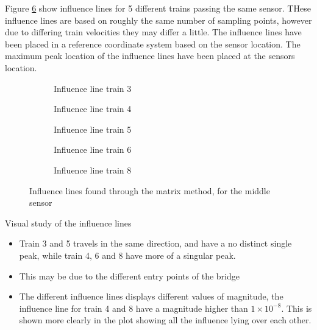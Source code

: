 Figure \ref{fig:Influence_lines} show influence lines for 5 different trains passing the same sensor. THese influence lines are based on roughly the same number of sampling points, however due to differing train velocities they may differ a little. The influence lines have been placed in a reference coordinate system based on the sensor location. The maximum peak location of the influence lines have been placed at the sensors location.
	\begin{figure}[H]
		\begin{subfigure}[t]{0.4\textwidth}
			
			\caption{Influence line train 3}
			\label{fig:train3}
		\end{subfigure}
		\qquad
		\begin{subfigure}[t]{0.4\textwidth}
			
			\caption{Influence line train 4}
			\label{fig:train4}
		\end{subfigure}
		\begin{subfigure}[t]{0.4\textwidth}
			\centering
			
			\caption{Influence line train 5}
			\label{fig:train5}
		\end{subfigure}
		\qquad
		\begin{subfigure}[t]{0.4\textwidth}
			\centering
			
			\caption{Influence line train 6}
			\label{fig:train6}
		\end{subfigure}
		\begin{subfigure}[t]{0.9\textwidth}
			\centering
			
			\caption{Influence line train 8}
			\label{fig:train8}
		\end{subfigure}
		\caption{Influence lines found through the matrix method, for the middle sensor}
		\label{fig:Influence_lines}
	\end{figure}
Visual study of the influence lines
\begin{itemize}
	\item Train 3 and 5 travels in the same direction, and have a no distinct single peak, while train 4, 6 and 8 have more of a singular peak.
	\item This may be due to the different entry points of the bridge
	\item The different influence lines displays different values of magnitude, the influence line for train 4 and 8 have a magnitude higher than $ 1 \times 10^{-8} $. This is shown more clearly in the plot showing all the influence lying over each other.
\end{itemize}


